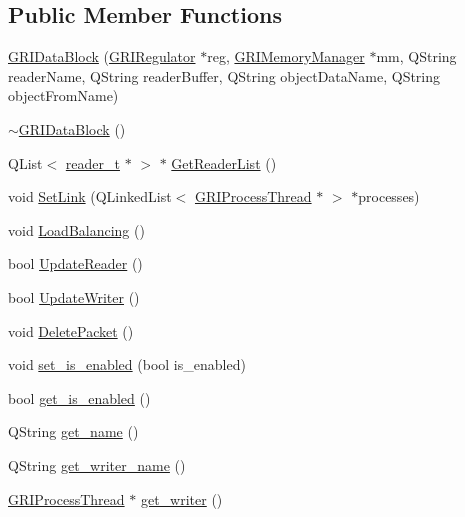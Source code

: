 \subsection*{\-Public \-Member \-Functions}
\begin{DoxyCompactItemize}
\item 
\hyperlink{classGRIDataBlock_a214dfc47dc01b101343a048cacf5cbb8}{\-G\-R\-I\-Data\-Block} (\hyperlink{classGRIRegulator}{\-G\-R\-I\-Regulator} $\ast$reg, \hyperlink{classGRIMemoryManager}{\-G\-R\-I\-Memory\-Manager} $\ast$mm, \-Q\-String reader\-Name, \-Q\-String reader\-Buffer, \-Q\-String object\-Data\-Name, \-Q\-String object\-From\-Name)
\item 
\hyperlink{classGRIDataBlock_a30c1e02eae93b7e92a9ef62ecfe8e748}{$\sim$\-G\-R\-I\-Data\-Block} ()
\item 
\-Q\-List$<$ \hyperlink{structreader__t}{reader\-\_\-t} $\ast$ $>$ $\ast$ \hyperlink{classGRIDataBlock_a419904d0843e583d9e8d86e1b16e690f}{\-Get\-Reader\-List} ()
\item 
void \hyperlink{classGRIDataBlock_a5cb3b15abf54d9d2a21911d47fe70f67}{\-Set\-Link} (\-Q\-Linked\-List$<$ \hyperlink{classGRIProcessThread}{\-G\-R\-I\-Process\-Thread} $\ast$ $>$ $\ast$processes)
\item 
void \hyperlink{classGRIDataBlock_af424f16590858f953f85ceeec0f2c02b}{\-Load\-Balancing} ()
\item 
bool \hyperlink{classGRIDataBlock_a6af736b80630f2dbe8898eea9af2e254}{\-Update\-Reader} ()
\item 
bool \hyperlink{classGRIDataBlock_a48ea48dbe792688b2a591b763de490a0}{\-Update\-Writer} ()
\item 
void \hyperlink{classGRIDataBlock_a66ea5e343b0fbb7e1ded2d3f998befd4}{\-Delete\-Packet} ()
\item 
void \hyperlink{classGRIDataBlock_ab2a5759eab3fbc73d7e02757cfccc9f6}{set\-\_\-is\-\_\-enabled} (bool is\-\_\-enabled)
\item 
bool \hyperlink{classGRIDataBlock_a6362ecc61cc2da70373aad8bfa527bc7}{get\-\_\-is\-\_\-enabled} ()
\item 
\-Q\-String \hyperlink{classGRIDataBlock_aa50d762ee5a51958b4f3d34b40dce9c9}{get\-\_\-name} ()
\item 
\-Q\-String \hyperlink{classGRIDataBlock_ab66752bd04383b5e51e1939bbf6a9392}{get\-\_\-writer\-\_\-name} ()
\item 
\hyperlink{classGRIProcessThread}{\-G\-R\-I\-Process\-Thread} $\ast$ \hyperlink{classGRIDataBlock_a7de6b71effd0e59b1035b8a195039058}{get\-\_\-writer} ()
\end{DoxyCompactItemize}

